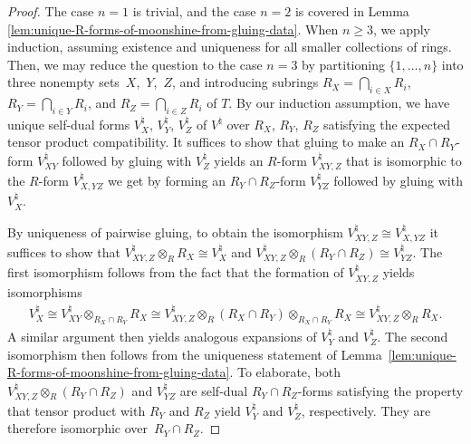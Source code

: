 \documentclass[11pt]{article}
\theoremstyle{definition}
\begin{document}
\begin{proof}
The case $n=1$ is trivial, and the case $n=2$ is covered in Lemma \ref{lem:unique-R-forms-of-moonshine-from-gluing-data}. When $n \geq 3$, we apply induction, assuming existence and uniqueness for all smaller collections of rings. Then, we may reduce the question to the case $n=3$ by partitioning $\{1,\ldots,n\}$ into three nonempty sets~$X$,~$Y$,~$Z$, and introducing subrings $R_X = \bigcap_{i \in X} R_i$, $R_Y = \bigcap_{i \in Y} R_i$, and $R_Z = \bigcap_{i \in Z} R_i$ of $T$. By our induction assumption, we have unique self-dual forms $V^\natural_X$, $V^\natural_Y$, $V^\natural_Z$ of $V^\natural$ over $R_X$, $R_Y$, $R_Z$ satisfying the expected tensor product compatibility. It suffices to show that gluing to make an $R_X \cap R_Y$-form $V^\natural_{XY}$ followed by gluing with $V^\natural_Z$ yields an $R$-form $V^\natural_{XY,Z}$ that is isomorphic to the $R$-form $V^\natural_{X,YZ}$ we get by forming an $R_Y \cap R_Z$-form $V^\natural_{YZ}$ followed by gluing with $V^\natural_X$.

By uniqueness of pairwise gluing, to obtain the isomorphism $V^\natural_{XY,Z} \cong V^\natural_{X,YZ}$ it suffices to show that $V^\natural_{XY,Z} \otimes_{R} R_X \cong V^\natural_X$ and $V^\natural_{XY,Z} \otimes_{R} (R_Y \cap R_Z) \cong V^\natural_{YZ}$. The first isomorphism follows from the fact that the formation of $V^\natural_{XY,Z}$ yields isomorphisms
\begin{gather*}
V^\natural_X \cong V^\natural_{XY} \otimes_{R_X \cap R_Y} R_X \cong V^\natural_{XY,Z} \otimes_{R} (R_X \cap R_Y) \otimes_{R_X \cap R_Y} R_X \cong V^\natural_{XY,Z} \otimes_{R} R_X.
\end{gather*}
A similar argument then yields analogous expansions of $V^\natural_Y$ and $V^\natural_Z$. The second isomorphism then follows from the uniqueness statement of Lemma~\ref{lem:unique-R-forms-of-moonshine-from-gluing-data}. To elaborate, both $V^\natural_{XY,Z} \otimes_{R} (R_Y \cap R_Z)$ and $V^\natural_{YZ}$ are self-dual $R_Y \cap R_Z$-forms satisfying the property that tensor product with $R_Y$ and $R_Z$ yield $V^\natural_Y$ and $V^\natural_Z$, respectively. They are therefore isomorphic over~$R_Y \cap R_Z$.
\end{proof}
\end{document}
